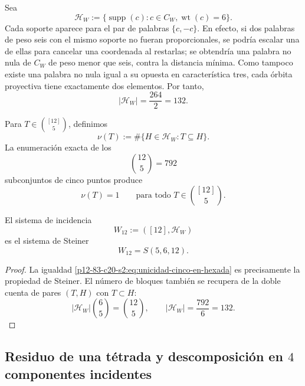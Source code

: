 Sea
\begin{equation}
 \mathcal H_W
 :=\{\operatorname{supp}(c):c\in C_W,
                              \operatorname{wt}(c)=6\}.
 \label{p12-83-c20-s2:eq:familia-soportes-peso-seis}
\end{equation}
Cada soporte aparece para el par de palabras \(\{c,-c\}\). En efecto, si dos
palabras de peso seis con el mismo soporte no fueran proporcionales, se podría
escalar una de ellas para cancelar una coordenada al restarlas; se obtendría
una palabra no nula de \(C_W\) de peso menor que seis, contra la distancia
mínima. Como tampoco existe una palabra no nula igual a su opuesta en
característica tres, cada órbita proyectiva tiene exactamente dos elementos.
Por tanto,
\begin{equation}
 |\mathcal H_W|=\frac{264}{2}=132.
 \label{p12-83-c20-s2:eq:numero-hexadas-cw}
\end{equation}

Para \(T\in\binom{[12]}5\), definimos
\begin{equation}
 \nu(T):=\#\{H\in\mathcal H_W:T\subseteq H\}.
 \label{p12-83-c20-s2:eq:incidencia-cinco-hexada}
\end{equation}
La enumeración exacta de los
\[
 \binom{12}{5}=792
\]
subconjuntos de cinco puntos produce
\begin{equation}
 \nu(T)=1
 \qquad
 \text{para todo }T\in\binom{[12]}5.
 \label{p12-83-c20-s2:eq:unicidad-cinco-en-hexada}
\end{equation}

\begin{theorem}
\label{p12-83-c20-s2:thm:w12-autonomo}
El sistema de incidencia
\[
 W_{12}:=([12],\mathcal H_W)
\]
es el sistema de Steiner
\begin{equation}
 \boxed{W_{12}=S(5,6,12).}
 \label{p12-83-c20-s2:eq:w12-steiner-autonomo}
\end{equation}
\end{theorem}

\begin{proof}
La igualdad \eqref{p12-83-c20-s2:eq:unicidad-cinco-en-hexada} es precisamente la
propiedad de Steiner. El número de bloques también se recupera de la doble
cuenta de pares \((T,H)\) con \(T\subset H\):
\[
 |\mathcal H_W|\binom65=\binom{12}{5},
 \qquad
 |\mathcal H_W|=\frac{792}{6}=132.
\]
\end{proof}

\subsection{Residuo de una tétrada y descomposición en \(4\) componentes incidentes}

